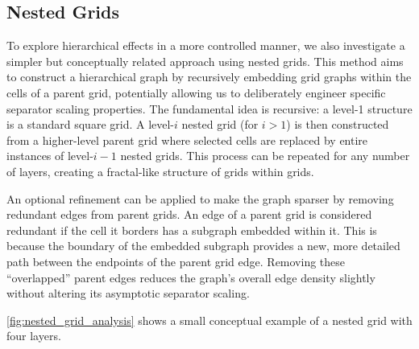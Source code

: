 \subsection{Nested Grids}

To explore hierarchical effects in a more controlled manner, we also investigate a simpler but conceptually related approach using nested grids.
This method aims to construct a hierarchical graph by recursively embedding grid graphs within the cells of a parent grid, potentially allowing us to deliberately engineer specific separator scaling properties.
The fundamental idea is recursive: a level-1 structure is a standard square grid.
A level-\(i\) nested grid (for \(i > 1\)) is then constructed from a higher-level parent grid where selected cells are replaced by entire instances of level-\(i-1\) nested grids.
This process can be repeated for any number of layers, creating a fractal-like structure of grids within grids.

An optional refinement can be applied to make the graph sparser by removing redundant edges from parent grids.
An edge of a parent grid is considered redundant if the cell it borders has a subgraph embedded within it.
This is because the boundary of the embedded subgraph provides a new, more detailed path between the endpoints of the parent grid edge.
Removing these \enquote{overlapped} parent edges reduces the graph's overall edge density slightly without altering its asymptotic separator scaling.

\cref{fig:nested_grid_analysis} shows a small conceptual example of a nested grid with four layers.

